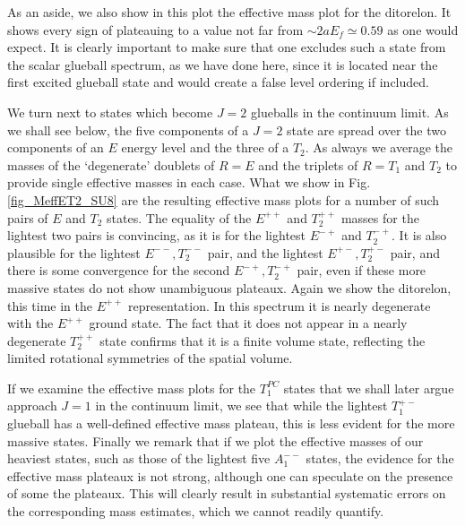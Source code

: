 \documentclass[12pt]{article}
\begin{document}
As an aside, we also show in this
plot the effective mass plot for the ditorelon. It shows every sign of plateauing
to a value not far from $\sim 2aE_f\simeq 0.59$ as one would expect. It is clearly
important to make sure that one excludes such a state from the scalar glueball spectrum,
as we have done here, since it is located near the first excited glueball state
and would create a false level ordering if included.

We turn next to states which become $J=2$ glueballs in the continuum limit.
As we shall see below, the five components of a $J=2$ state are spread over
the two components of an $E$ energy level and the three of a $T_2$. As always
we average the masses of the `degenerate' doublets of $R=E$ and the triplets of
$R=T_1$ and $T_2$ to provide single effective masses in each case. What we show
in Fig.\ref{fig_MeffET2_SU8} are the resulting effective mass plots for a number
of such pairs of $E$ and $T_2$ states. The equality of the $E^{++}$ and $T_2^{++}$ masses
for the lightest two pairs is convincing, as it is for the lightest  $E^{-+}$
and $T_2^{-+}$. It is also plausible for the lightest $E^{--},T_2^{--}$
pair, and the lightest  $E^{+-},T_2^{+-}$ pair, and there is some convergence
for the second  $E^{-+},T_2^{-+}$ pair, even if these more massive states
do not show unambiguous plateaux. Again we show the ditorelon, this time in
the $E^{++}$ representation. In this spectrum it is nearly degenerate with
the  $E^{++}$  ground state. The fact that it does not appear in a nearly
degenerate $T_2^{++}$ state confirms that it is a finite volume state,
reflecting the limited rotational symmetries of the spatial volume.

If we examine the effective mass plots for the $T_1^{PC}$ states that we shall
later argue approach $J=1$ in the continuum limit, we see that
while the lightest $T_1^{+-}$ glueball has a well-defined effective mass plateau,
this is less evident for the more massive states.
Finally we remark that if we plot the  effective masses of our heaviest states,
such as those of the lightest five $A_1^{--}$ states,
the evidence for the effective mass plateaux is not strong, although one can
speculate on the presence of some the plateaux.
This will clearly result in substantial systematic errors on the corresponding mass
estimates, which we cannot readily quantify.
\end{document}
